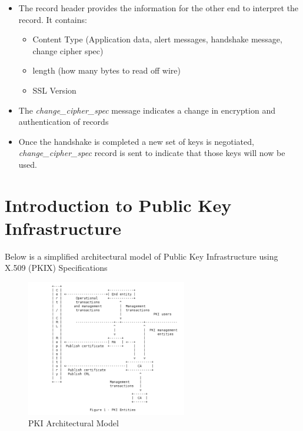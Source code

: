 \documentclass[a4paper]{article}
\begin{document}
\begin{itemize}
\begin{itemize}
                \item The record header provides the information for the other end to interpret the record. It contains:
                    \begin{itemize}
                        \item Content Type (Application data, alert messages, handshake message, change cipher spec)
                        \item length  (how many bytes to read off wire)
                        \item SSL Version
                    \end{itemize}
                \item The \textit{change\_cipher\_spec} message indicates a change in encryption and authentication of records
                \item Once the handshake is completed a new set of keys is negotiated, \textit{change\_cipher\_spec} record is 
                    sent to indicate that those keys will now be used.
            \end{itemize}
    \end{itemize}
\section{Introduction to Public Key Infrastructure}
Below is a simplified architectural model of Public Key Infrastructure using X.509 (PKIX) Specifications
\begin{figure}[ht!]
    \centering
    \includegraphics[width=70mm]{pki-architectural-model.png}
    \caption{PKI Architectural Model}
\end{figure}
\end{document}
